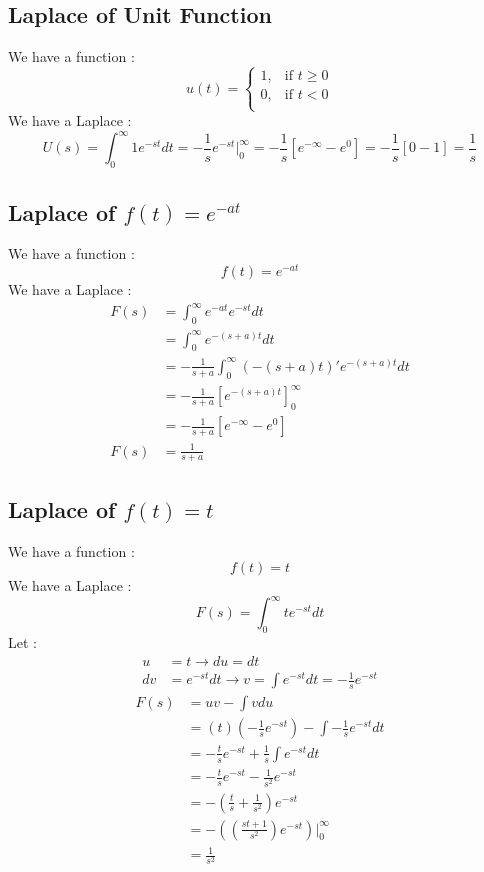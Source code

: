 \documentclass[12pt,a4paper]{article}
\begin{document}
	\subsection{Laplace of Unit Function}
	We have a function :
	\[
	u(t) = 
	\begin{cases}
		1, & \text{if } t\geq 0\\
		0, & \text{if } t<0\\
	\end{cases}       
	\]
	We have a Laplace :
	\[
	U(s) = \int_{0}^{\infty} 1e^{-st} dt = -\frac{1}{s} e^{-st} |_0^\infty = -\frac{1}{s}[e^{-\infty} - e^{0}] = -\frac{1}{s}[0 - 1] = \frac{1}{s}
	\]
	
	\subsection{Laplace of \(f(t) = e^{-at}\)}
	We have a function :
	\[
	f(t) = e^{-at}
	\]
	We have a Laplace :
	\[
	\begin{split}
		F(s) &= \int_{0}^{\infty} e^{-at} e^{-st} dt \\
			 &= \int_{0}^{\infty} e^{-(s+a)t} dt \\
			 &= -\frac{1}{s+a} \int_{0}^{\infty} (-(s+a)t)' e^{-(s+a)t} dt \\
			 &= -\frac{1}{s+a} \left[e^{-(s+a)t}\right]_0^\infty  \\
			 &= -\frac{1}{s+a} \left[e^{-\infty} - e^0\right]  \\
		F(s) &= \frac{1}{s+a}
	\end{split}
	\]
	
	\subsection{Laplace of \(f(t) = t\)}
	We have a function :
	\[
	f(t) = t
	\]
	We have a Laplace :
	\[
	F(s) = \int_{0}^{\infty} t e^{-st} dt
	\]
	Let :
	\[
	\begin{split}
		u &= t \rightarrow du = dt\\
		dv &= e^{-st} dt \rightarrow v = \int e^{-st}dt = -\frac{1}{s} e^{-st}
	\end{split}
	\]
	\[
	\begin{split}
	F(s) &= uv - \int vdu \\
	                 &= (t) (-\frac{1}{s} e^{-st}) - \int -\frac{1}{s} e^{-st} dt \\
	                 &= -\frac{t}{s} e^{-st} +\frac{1}{s} \int e^{-st} dt \\
	                 &= -\frac{t}{s} e^{-st} -\frac{1}{s^2} e^{-st} \\
	                 &= -(\frac{t}{s} +\frac{1}{s^2}) e^{-st} \\
	                 &= -\left((\frac{st+1}{s^2}) e^{-st} \right) |_0^\infty \\
	                 &= \frac{1}{s^2}
	\end{split}
	\]
	
\end{document}
